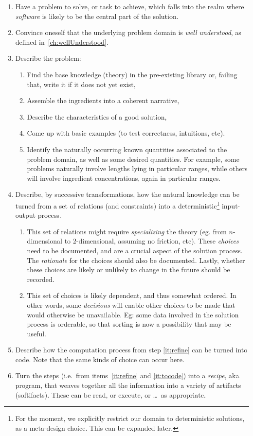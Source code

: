 \documentclass[sigconf,review]{acmart}
\begin{document}
\begin{enumerate}
\item\label{it:problem} Have a problem to solve, or task to achieve, which
falls into the realm where \emph{software} is likely to be the central part of
the solution.
\item\label{it:understood} Convince oneself that the underlying problem domain
is \emph{well understood}, as defined in~\autoref{ch:wellUnderstood}.
\item\label{it:probdesc} Describe the problem:
  \begin{enumerate}
  \item Find the base knowledge (theory) in the pre-existing library
    or, failing that, write it if it does not yet exist,
  \item Assemble the ingredients into a coherent narrative,
  \item Describe the characteristics of a good solution,
  \item Come up with basic examples (to test correctness, intuitions, etc).
  \item Identify the naturally occurring known quantities associated to the
    problem domain, as well as some desired quantities. For example,
    some problems naturally involve lengths lying in particular
    ranges, while others will involve ingredient concentrations, again
    in particular ranges.
  \end{enumerate}
\item\label{it:refine} Describe, by successive transformations, how the natural
knowledge can be turned from a set of relations (and constraints) into a
deterministic\footnote{For the moment, we explicitly restrict our domain to
deterministic solutions, as a meta-design choice. This can be expanded later.}
input-output process.
  \begin{enumerate}
  \item This set of relations might require \emph{specializing} the
    theory (eg. from $n$-dimensional to $2$-dimensional, assuming no
    friction, etc).  These \emph{choices} need to be documented, and are
    a crucial aspect of the solution process. The \emph{rationale} for the
    choices should also be documented. Lastly, whether these choices are
    likely or unlikely to change in the future should be recorded.
  \item This set of choices is likely dependent, and thus somewhat ordered.
  In other words, some \emph{decisions} will enable other choices to be
  made that would otherwise be unavailable. Eg: some data involved in the
  solution process is orderable, so that sorting is now a possibility that
  may be useful.
  \end{enumerate}
\item\label{it:tocode} Describe how the computation process from step
\ref{it:refine} can be turned into code. Note that the same kinds of choice
can occur here.
\item\label{it:recipe} Turn the steps (i.e.\ from items~\ref{it:refine} and
\ref{it:tocode}) into a \emph{recipe}, aka program, that weaves together
all the information into a variety of artifacts (softifacts). These can
be read, or execute, or \ldots\ as appropriate.
\end{enumerate}
\end{document}
